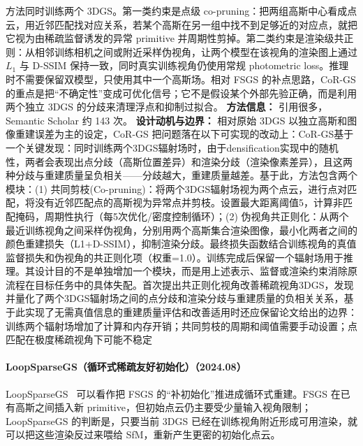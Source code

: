 方法同时训练两个 3DGS。第一类约束是点级 co-pruning：把两组高斯中心看成点云，用近邻匹配找对应关系，若某个高斯在另一组中找不到足够近的对应点，就把它视为由稀疏监督诱发的异常 primitive 并周期性剪掉。第二类约束是渲染级共正则：从相邻训练相机之间或附近采样伪视角，让两个模型在该视角的渲染图上通过 $L_1$ 与 D-SSIM 保持一致，同时真实训练视角仍使用常规 photometric loss。推理时不需要保留双模型，只使用其中一个高斯场。相对 FSGS 的补点思路，CoR-GS 的重点是把“不确定性”变成可优化信号；它不是假设某个外部先验正确，而是利用两个独立 3DGS 的分歧来清理浮点和抑制过拟合。
\textbf{方法信息：} 引用很多，Semantic Scholar 约 143 次。
\textbf{设计动机与边界：} 相对原始 3DGS 以独立高斯和图像重建误差为主的设定，CoR-GS 把问题落在以下可实现的改动上：CoR-GS基于一个关键发现：同时训练两个3DGS辐射场时，由于densification实现中的随机性，两者会表现出点分歧（高斯位置差异）和渲染分歧（渲染像素差异），且这两种分歧与重建质量呈负相关——分歧越大，重建质量越差。基于此，方法包含两个模块：(1) 共同剪枝(Co-pruning)：将两个3DGS辐射场视为两个点云，进行点对匹配，将没有近邻匹配点的高斯视为异常点并剪枝。设置最大距离阈值5，计算非匹配掩码，周期性执行（每5次优化/密度控制循环）；(2) 伪视角共正则化：从两个最近训练视角之间采样伪视角，分别用两个高斯集合渲染图像，最小化两者之间的颜色重建损失（L1+D-SSIM），抑制渲染分歧。最终损失函数结合训练视角的真值监督损失和伪视角的共正则化项（权重=1.0）。训练完成后保留一个辐射场用于推理。其设计目的不是单独增加一个模块，而是用上述表示、监督或渲染约束消除原流程在目标任务中的具体失配。首次提出共正则化视角改善稀疏视角3DGS，发现并量化了两个3DGS辐射场之间的点分歧和渲染分歧与重建质量的负相关关系，基于此实现了无需真值信息的重建质量评估和改善适用时还应保留论文给出的边界：训练两个辐射场增加了计算和内存开销；共同剪枝的周期和阈值需要手动设置；点匹配在极度稀疏视角下可能不稳定
\paragraph{LoopSparseGS（循环式稀疏友好初始化）（2024.08）}
LoopSparseGS~\cite{2408_00254} 可以看作把 FSGS 的“补初始化”推进成循环式重建。FSGS 在已有高斯之间插入新 primitive，但初始点云仍主要受少量输入视角限制；LoopSparseGS 的判断是，只要当前 3DGS 已经在训练视角附近形成可用渲染，就可以把这些渲染反过来喂给 SfM，重新产生更密的初始化点云。

